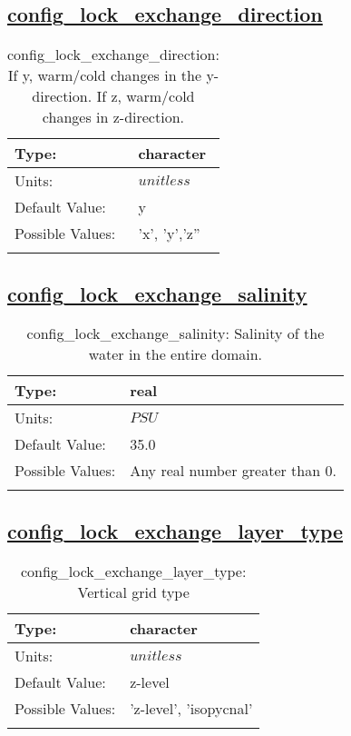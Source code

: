 \subsection[config\_lock\_exchange\_direction]{\hyperref[sec:nm_tab_lock_exchange]{config\_lock\_exchange\_direction}}
\label{subsec:nm_sec_config_lock_exchange_direction}
\begin{center}
\begin{longtable}{| p{2.0in} || p{4.0in} |}
    \hline
    Type: & character \\
    \hline
    Units: & $unitless$ \\
    \hline
    Default Value: & y \\
    \hline
    Possible Values: & 'x', 'y','z'' \\
    \hline
    \caption{config\_lock\_exchange\_direction: If y, warm/cold changes in the y-direction.  If z, warm/cold changes in z-direction.}
\end{longtable}
\end{center}
\subsection[config\_lock\_exchange\_salinity]{\hyperref[sec:nm_tab_lock_exchange]{config\_lock\_exchange\_salinity}}
\label{subsec:nm_sec_config_lock_exchange_salinity}
\begin{center}
\begin{longtable}{| p{2.0in} || p{4.0in} |}
    \hline
    Type: & real \\
    \hline
    Units: & $PSU$ \\
    \hline
    Default Value: & 35.0 \\
    \hline
    Possible Values: & Any real number greater than 0. \\
    \hline
    \caption{config\_lock\_exchange\_salinity: Salinity of the water in the entire domain.}
\end{longtable}
\end{center}
\subsection[config\_lock\_exchange\_layer\_type]{\hyperref[sec:nm_tab_lock_exchange]{config\_lock\_exchange\_layer\_type}}
\label{subsec:nm_sec_config_lock_exchange_layer_type}
\begin{center}
\begin{longtable}{| p{2.0in} || p{4.0in} |}
    \hline
    Type: & character \\
    \hline
    Units: & $unitless$ \\
    \hline
    Default Value: & z-level \\
    \hline
    Possible Values: & 'z-level', 'isopycnal' \\
    \hline
    \caption{config\_lock\_exchange\_layer\_type: Vertical grid type}
\end{longtable}
\end{center}
